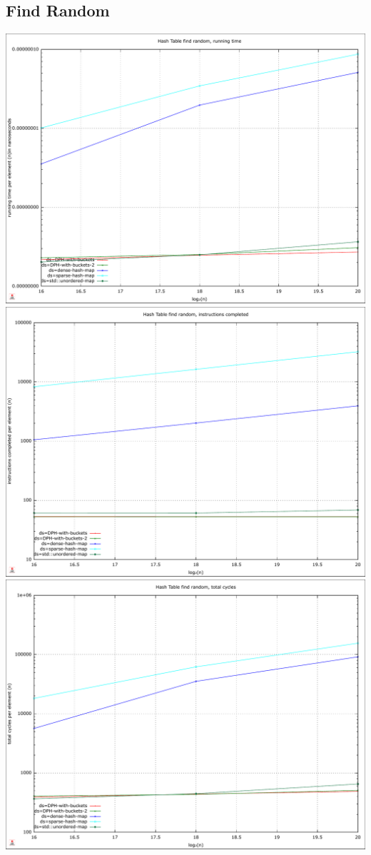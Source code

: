 \documentclass{article}
\begin{document}
\subsection*{Find Random}
\centering
\includegraphics[width=\linewidth]{img/hash_find-random_time}
\includegraphics[width=\linewidth]{img/hash_find-random_instructions}
\includegraphics[width=\linewidth]{img/hash_find-random_cycles}
\end{document}
